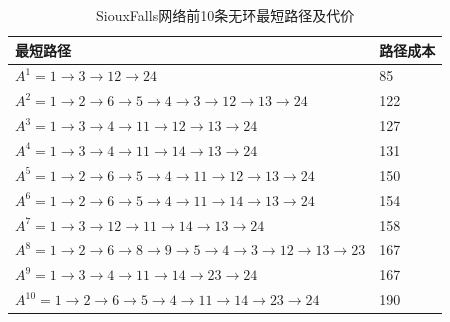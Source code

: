 \begin{table}[H]
    \begin{center}
        \caption{SiouxFalls网络前10条无环最短路径及代价}\label{tab:table1}
        \begin{tabular}{ll}
            \hline
            最短路径                                                                                                                                                    & 路径成本 \\
            \hline
            $A^1= 1 \rightarrow 3 \rightarrow 12 \rightarrow 24$                                                                                                    & 85   \\
            $A^2= 1 \rightarrow 2 \rightarrow 6 \rightarrow 5 \rightarrow 4 \rightarrow 3 \rightarrow 12 \rightarrow 13 \rightarrow 24$     & 122  \\
            $A^3= 1 \rightarrow 3 \rightarrow 4 \rightarrow 11 \rightarrow 12 \rightarrow 13 \rightarrow 24$     & 127  \\
            $A^4= 1 \rightarrow 3 \rightarrow 4 \rightarrow 11 \rightarrow 14 \rightarrow 13 \rightarrow 24$     & 131  \\
            $A^5= 1 \rightarrow 2 \rightarrow 6 \rightarrow 5 \rightarrow 4 \rightarrow 11 \rightarrow 12 \rightarrow 13 \rightarrow 24$     & 150  \\
            $A^6= 1 \rightarrow 2 \rightarrow 6 \rightarrow 5 \rightarrow 4 \rightarrow 11 \rightarrow 14 \rightarrow 13 \rightarrow 24$     & 154  \\
            $A^7= 1 \rightarrow 3 \rightarrow 12 \rightarrow 11 \rightarrow 14 \rightarrow 13 \rightarrow 24$     & 158  \\
            $A^8= 1 \rightarrow 2 \rightarrow 6 \rightarrow 8 \rightarrow 9 \rightarrow 5 \rightarrow 4 \rightarrow 3 \rightarrow 12 \rightarrow 13 \rightarrow 23$     & 167  \\
            $A^9= 1 \rightarrow 3 \rightarrow 4 \rightarrow 11 \rightarrow 14 \rightarrow 23 \rightarrow 24$     & 167  \\
            $A^{10} = 1 \rightarrow 2 \rightarrow 6 \rightarrow 5 \rightarrow 4 \rightarrow 11 \rightarrow 14 \rightarrow 23 \rightarrow 24$ & 190  \\
            \hline
        \end{tabular}
    \end{center}
\end{table}

